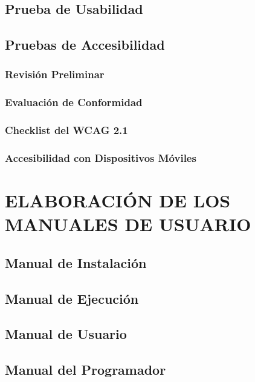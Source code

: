 \documentclass[11pt]{report} %
\begin{document}
\subsection{Prueba de Usabilidad}

\subsection{Pruebas de Accesibilidad} 
 
\subsubsection{Revisión Preliminar} 

\subsubsection{Evaluación de Conformidad} 

\subsubsection{Checklist del WCAG 2.1} 

\subsubsection{Accesibilidad con Dispositivos Móviles} 


\newpage
\section{ELABORACIÓN DE LOS MANUALES DE USUARIO}

\subsection{Manual de Instalación} 

\subsection{Manual de Ejecución} 

\subsection{Manual de Usuario} 

\subsection{Manual del Programador}
\end{document}
